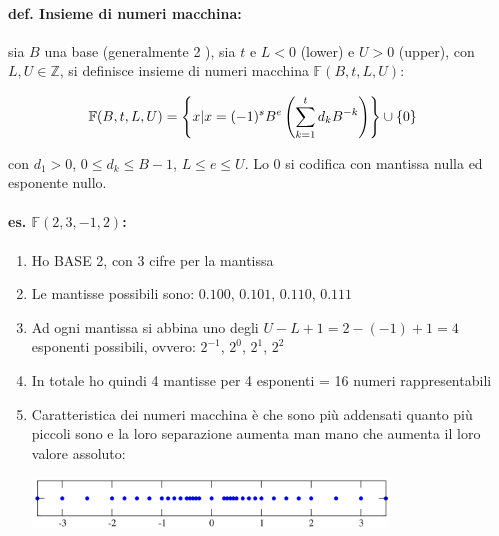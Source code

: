 \documentclass[a4paper, 11pt]{article}
\begin{document}
            \paragraph{def. Insieme di numeri macchina: } sia $B$ una base (generalmente 2 ), sia $t$ e $L < 0$ (lower) e $U > 0$ (upper), con $L, U \in \mathbb{Z}$, si definisce insieme di numeri macchina $\mathbb{F}(B, t, L, U)$:



            \begin{align}
                \mathbb{F}(B, t, L, U) &= \left\{ x | x = (-1)^s B^e \left(\sum_{k = 1}^{t} d_k B^{-k}\right) \right\} \cup \{ 0 \} \notag
            \end{align}



            con $d_1 > 0$, $0 \leq d_k \leq B-1$, $L \leq e \leq  U$. Lo $0$ si codifica con mantissa nulla ed esponente nullo.

            \paragraph{es. $\mathbb{F}(2, 3,-1, 2)$: }

            \begin{enumerate}
                \item Ho BASE 2, con 3 cifre per la mantissa
                
                \item Le mantisse possibili sono: $0.100$, $0.101$, $0.110$, $0.111$
                
                \item Ad ogni mantissa si abbina uno degli $U-L+1 = 2-(-1)+1 = 4$ esponenti possibili, ovvero: $2^{-1}$, $2^0$, $2^1$, $2^2$ 
                
                \item In totale ho quindi 4 mantisse per 4 esponenti = 16 numeri rappresentabili
                
                \item Caratteristica dei numeri macchina è che sono più addensati quanto più piccoli sono e la loro separazione aumenta man mano che aumenta il loro valore assoluto:
                
                \begin{center}
                    \includegraphics[width=0.75\textwidth]{rapp.png}
                \end{center}

            \end{enumerate}
\end{document}
